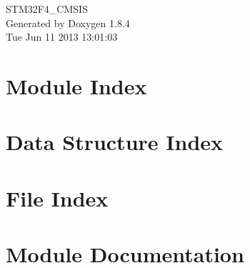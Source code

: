 \documentclass[twoside]{book}
\newcommand{\clearemptydoublepage}{%
  \newpage{\pagestyle{empty}\cleardoublepage}%
}
\begin{document}
\hypersetup{pageanchor=false}
\begin{titlepage}
\vspace*{7cm}
\begin{center}%
{\Large S\-T\-M32\-F4\-\_\-\-C\-M\-S\-I\-S }\\
\vspace*{1cm}
{\large Generated by Doxygen 1.8.4}\\
\vspace*{0.5cm}
{\small Tue Jun 11 2013 13:01:03}\\
\end{center}
\end{titlepage}
\clearemptydoublepage
\tableofcontents
\clearemptydoublepage
{}
\hypersetup{pageanchor=true}

\chapter{Module Index}

\chapter{Data Structure Index}

\chapter{File Index}

\chapter{Module Documentation}
























\end{document}
